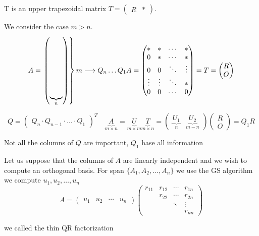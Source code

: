 T is an upper trapezoidal matrix $ T = \begin{pmatrix} R & * \end{pmatrix}$.

We consider the case $m > n$.
\[
A = \left.
\begin{pmatrix}
    \underbrace{\rule{0pt}{3cm}}_{n} \\
\end{pmatrix}
\right\}m
\longrightarrow Q_{n}\ldots Q_1A = \begin{pmatrix}
    * & * & \cdots & * \\
    0 & * & \cdots & * \\
    0 & 0 & \ddots & \vdots \\
    \vdots & \vdots & \ddots & * \\
    0 & 0 & \cdots & 0
\end{pmatrix} = T = \begin{pmatrix}
    R \\ O
\end{pmatrix}
\]

$$
Q = \begin{pmatrix} Q_n \cdot Q_{n-1} \cdot \ldots \cdot Q_1 \end{pmatrix}^T \quad
\underbrace{A}_{m \times n} = \underbrace{U}_{m \times m} \underbrace{T}_{m \times n}
= \begin{pmatrix}
    \underbrace{U_1}_{n} & \underbrace{U_2}_{m-n}
\end{pmatrix}
\begin{pmatrix}
    R \\ O
\end{pmatrix}
= Q_1R
$$

Not all the columns of $Q$ are important, $Q_1$ hase all information

Let us suppose that the columns of $A$ are linearly independent and we wish to compute an orthogonal basis.
For span $\{A_1, A_2, \ldots, A_n\}$ we use the GS algorithm we compute $u_1, u_2, \ldots, u_n$
\[
A = \begin{pmatrix}
    u_1 & u_2 & \cdots & u_n
\end{pmatrix}
\begin{pmatrix}
    r_{11} & r_{12} & \cdots & r_{1n} \\
    & r_{22} & \cdots & r_{2n} \\
    & & \ddots & \vdots \\
    & & & r_{nn}
\end{pmatrix}
\]

we called the thin QR factorization

